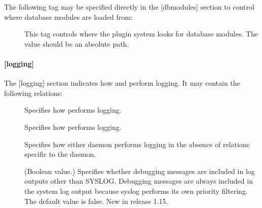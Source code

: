 \documentclass[letterpaper,10pt,english]{sphinxmanual}
\begin{document}
The following tag may be specified directly in the {[}dbmodules{]}
section to control where database modules are loaded from:
\begin{description}
\item[{}] \leavevmode
This tag controls where the plugin system looks for database
modules.  The value should be an absolute path.

\end{description}


\paragraph{{[}logging{]}}
\label{\detokenize{admin/conf_files/kdc_conf:id4}}\label{\detokenize{admin/conf_files/kdc_conf:logging}}
The {[}logging{]} section indicates how {\hyperref[\detokenize{admin/admin_commands/krb5kdc:krb5kdc-8}]{}} and
{\hyperref[\detokenize{admin/admin_commands/kadmind:kadmind-8}]{}} perform logging.  It may contain the following
relations:
\begin{description}
\item[{}] \leavevmode
Specifies how {\hyperref[\detokenize{admin/admin_commands/kadmind:kadmind-8}]{}} performs logging.

\item[{}] \leavevmode
Specifies how {\hyperref[\detokenize{admin/admin_commands/krb5kdc:krb5kdc-8}]{}} performs logging.

\item[{}] \leavevmode
Specifies how either daemon performs logging in the absence of
relations specific to the daemon.

\item[{}] \leavevmode
(Boolean value.)  Specifies whether debugging messages are
included in log outputs other than SYSLOG.  Debugging messages are
always included in the system log output because syslog performs
its own priority filtering.  The default value is false.  New in
release 1.15.

\end{description}
\end{document}
